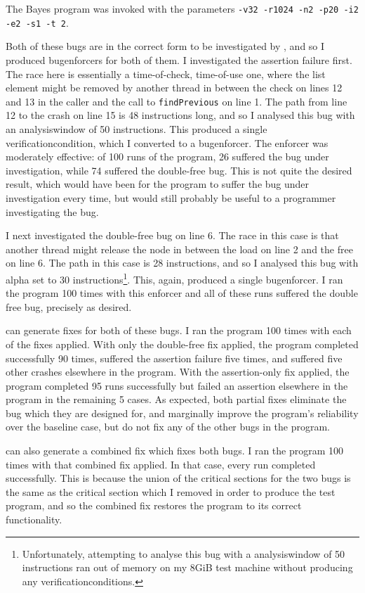 The Bayes program was invoked with the parameters \texttt{-v32 -r1024
  -n2 -p20 -i2 -e2 -s1 -t 2}.

Both of these bugs are in the correct form to be investigated by
{\technique}, and so I produced \glspl{bugenforcer} for both of them.
I investigated the assertion failure first.  The race here is
essentially a time-of-check, time-of-use one, where the list element
might be removed by another thread in between the check on lines 12
and 13 in the caller and the call to \texttt{findPrevious} on line 1.
The path from line 12 to the crash on line 15 is 48 instructions long,
and so I analysed this bug with an \gls{analysiswindow} of 50
instructions.  This produced a single \gls{verificationcondition},
which I converted to a \gls{bugenforcer}.  The enforcer was moderately
effective: of 100 runs of the program, 26 suffered the bug under
investigation, while 74 suffered the double-free bug.  This is not
quite the desired result, which would have been for the program to
suffer the bug under investigation every time, but would still
probably be useful to a programmer investigating the bug.

I next investigated the double-free bug on line 6.  The race in this
case is that another thread might release the node in between the load
on line 2 and the free on line 6.  The path in this case is 28
instructions, and so I analysed this bug with \gls{alpha} set to 30
instructions\footnote{Unfortunately, attempting to analyse this bug
  with a \gls{analysiswindow} of 50 instructions ran out of memory on
  my 8GiB test machine without producing any
  \glspl{verificationcondition}.}.  This, again, produced a single
\gls{bugenforcer}.  I ran the program 100 times with this enforcer
and all of these runs suffered the double free bug, precisely as
desired.

{\Technique} can generate fixes for both of these bugs.  I ran the
program 100 times with each of the fixes applied.  With only the
double-free fix applied, the program completed successfully 90 times,
suffered the assertion failure five times, and suffered five other
crashes elsewhere in the program.  With the assertion-only fix
applied, the program completed 95 runs successfully but failed an
assertion elsewhere in the program in the remaining 5 cases.  As
expected, both partial fixes eliminate the bug which they are designed
for, and marginally improve the program's reliability over the
baseline case, but do not fix any of the other bugs in the program.

{\Technique} can also generate a combined fix which fixes both bugs.
I ran the program 100 times with that combined fix applied.  In that
case, every run completed successfully.  This is because the union of
the critical sections for the two bugs is the same as the critical
section which I removed in order to produce the test program, and so
the combined fix restores the program to its correct functionality.

